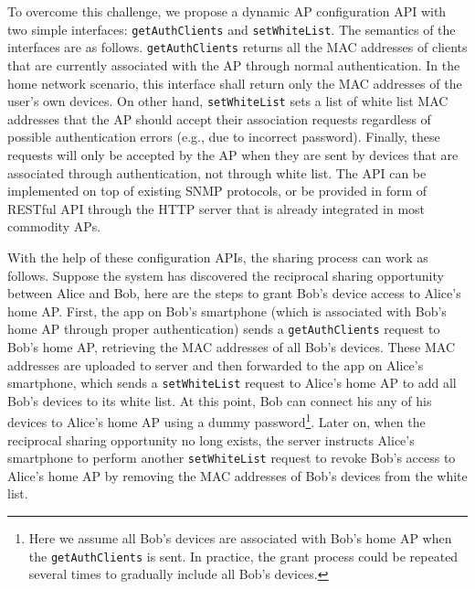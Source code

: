 To overcome this challenge, we propose a dynamic \wifi{} AP configuration API
with two simple interfaces: \texttt{getAuthClients} and \texttt{setWhiteList}.
The semantics of the interfaces are as follows.  \texttt{getAuthClients} 
returns all the MAC addresses of clients that are currently associated with the
AP through normal authentication. In the home \wifi{} network scenario, this
interface shall return only the MAC addresses of the user's own \wifi{} devices.  On
other hand, \texttt{setWhiteList} sets a list of white list MAC addresses that
the AP should accept their association requests regardless of possible
authentication errors (e.g., due to incorrect \wifi{} password). Finally, these
requests will only be accepted by the AP when they are sent by devices that are
associated through authentication, not through white list. The API can be
implemented on top of existing SNMP protocols, or be provided in form of RESTful
API through the HTTP server that is already integrated in most commodity APs.

With the help of these configuration APIs, the \wifi{} sharing process can work
as follows. Suppose the \wisefi{} system has discovered the reciprocal sharing
opportunity between Alice and Bob, here are the steps to grant Bob's device
access to
Alice's home AP. First, the \wisefi{} app on Bob's smartphone (which is
associated with Bob's home AP through proper authentication) sends a
\texttt{getAuthClients} request to Bob's home AP, retrieving the MAC addresses
of all Bob's devices. These MAC addresses are uploaded to \wisefi{} server and
then forwarded to the \wisefi{} app on Alice's smartphone, which sends a
\texttt{setWhiteList} request to Alice's home AP to add all Bob's devices to its
white list. At this point, Bob can connect his any of his devices to Alice's
home AP using a dummy password\footnote{Here we assume all Bob's devices are
associated with Bob's home AP when the \texttt{getAuthClients} is sent. In
practice, the grant process could be repeated several times to gradually
include all Bob's devices.}. Later on, when the reciprocal sharing
opportunity no long exists, the \wisefi{} server instructs Alice's smartphone to
perform another \texttt{setWhiteList} request to revoke Bob's access to Alice's
home AP by removing the MAC addresses of Bob's devices from the white list.

